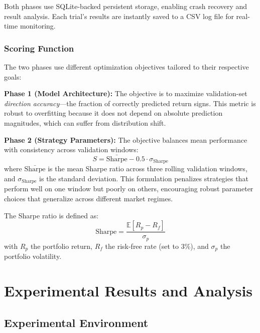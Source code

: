 \documentclass[12pt, a4paper]{article}
\begin{document}
Both phases use SQLite-backed persistent storage, enabling crash recovery and result analysis. Each trial's results are instantly saved to a CSV log file for real-time monitoring.

\subsubsection{Scoring Function}

The two phases use different optimization objectives tailored to their respective goals:

\textbf{Phase 1 (Model Architecture):} The objective is to maximize validation-set \emph{direction accuracy}---the fraction of correctly predicted return signs. This metric is robust to overfitting because it does not depend on absolute prediction magnitudes, which can suffer from distribution shift.

\textbf{Phase 2 (Strategy Parameters):} The objective balances mean performance with consistency across validation windows:
\begin{equation}
S = \bar{\text{Sharpe}} - 0.5 \cdot \sigma_{\text{Sharpe}}
\end{equation}
where $\bar{\text{Sharpe}}$ is the mean Sharpe ratio across three rolling validation windows, and $\sigma_{\text{Sharpe}}$ is the standard deviation. This formulation penalizes strategies that perform well on one window but poorly on others, encouraging robust parameter choices that generalize across different market regimes.

The Sharpe ratio \citep{sharpe1966mutual} is defined as:
\begin{equation}
\text{Sharpe} = \frac{\mathbb{E}[R_p - R_f]}{\sigma_p}
\end{equation}
with $R_p$ the portfolio return, $R_f$ the risk-free rate (set to 3\%), and $\sigma_p$ the portfolio volatility.

\section{Experimental Results and Analysis} \label{sec:experiments}

\subsection{Experimental Environment}
\end{document}
